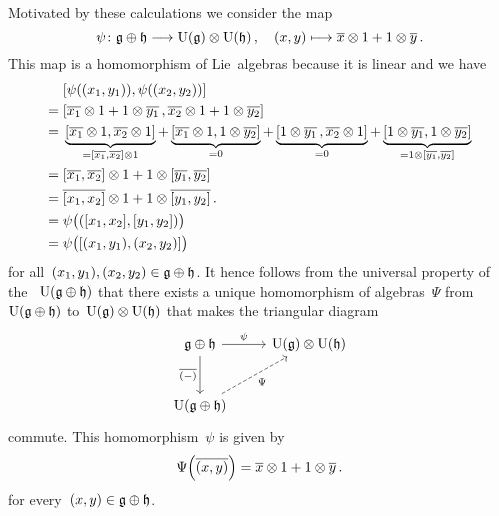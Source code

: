 \begin{example}
\begin{itemize}
			Motivated by these calculations we consider the map
			\[
				\psi
				\colon
				\glie \oplus \hlie
				\to
				\Univ(\glie) \tensor \Univ(\hlie) \,,
				\quad
				(x,y)
				\mapsto
				\class{x} \tensor 1 + 1 \tensor \class{y} \,.
			\]
			This map is a homomorphism of Lie~algebras because it is linear and we have
			\begin{align*}
				{}&
				[\psi((x_1, y_1)), \psi((x_2, y_2))]
				\\
				={}&
				[
					\overline{x_1} \otimes 1 + 1 \otimes \overline{y_1} \,,
					\overline{x_2} \otimes 1 + 1 \otimes \overline{y_2}
				]
				\\
				={}&
				\underbrace{ [\overline{x_1} \otimes 1, \overline{x_2} \otimes 1] }_{= [\overline{x_1}, \overline{x_2}] \otimes 1}
				+ \underbrace{ [\overline{x_1} \otimes 1, 1 \otimes \overline{y_2}] }_{=0}
				+ \underbrace{ [1 \otimes \overline{y_1} \,, \overline{x_2} \otimes 1] }_{=0}
				+ \underbrace{ [1 \otimes \overline{y_1}, 1 \otimes \overline{y_2}] }_{= 1 \otimes [\overline{y_1}, \overline{y_2}]}
				\\
				={}&
					[\overline{x_1}, \overline{x_2}] \otimes 1
				+ 1 \otimes [\overline{y_1}, \overline{y_2}]
				\\
				={}&
					\overline{[x_1, x_2]} \otimes 1
				+ 1 \otimes \overline{[y_1, y_2]}  \,.
				\\
				={}&
				\psi\bigl( ( [x_1, x_2], [y_1, y_2] ) \bigr)
				\\
				={}&
				\psi\bigl( [(x_1, y_1), (x_2, y_2)] \bigr)
			\end{align*}
			for all~$(x_1, y_1), (x_2, y_2) \in \mathfrak{g} \oplus \mathfrak{h}$.
			It hence follows from the universal property of the {\ua}~$\operatorname{U}(\mathfrak{g} \oplus \mathfrak{h})$ that there exists a unique homomorphism of algebras~$\Psi$ from~$\operatorname{U}(\mathfrak{g} \oplus \mathfrak{h})$ to~$\operatorname{U}(\mathfrak{g}) \otimes \operatorname{U}(\mathfrak{h})$ that makes the triangular diagram
			\[
				\begin{tikzcd}[row sep = large]
					\glie \oplus \hlie
					\arrow{r}[above]{\psi}
					\arrow{d}[left]{\class{(\ph)}}
					&
					\Univ(\glie) \tensor \Univ(\hlie)
					\\
					\Univ(\glie \oplus \hlie)
					\arrow[dashed]{ur}[below right]{\Psi}
					&
					{}
				\end{tikzcd}
			\]
			commute.
			This homomorphism~$\psi$ is given by
			\[
				\Psi\Bigl( \overline{(x,y)} \Bigr)
				=
				\overline{x} \otimes 1 + 1 \otimes \overline{y} \,.
			\]
			for every~$(x,y) \in \mathfrak{g} \oplus \mathfrak{h}$.
			

\end{itemize}
\end{example}
